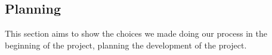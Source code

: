 \subsection{Planning}
This section aims to show the choices we made doing our process in the beginning of the project, planning the development of the project.





\newpage